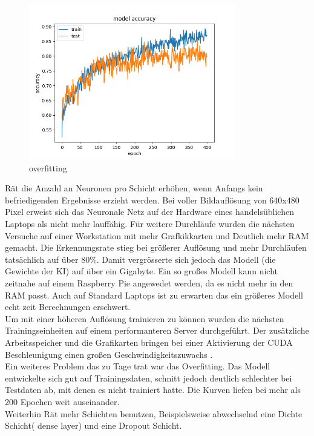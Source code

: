 \documentclass[conference]{IEEEtran}
\begin{document}
	\begin{figure}[!h]
		\centering
		\includegraphics[width=9cm]{img/213x160:400@32_accuracy.png}
		\caption{overfitting}
		\label{Overfitt }
	\end{figure}
	
	\cite{moolayil2019learn} Rät die Anzahl an Neuronen pro Schicht erhöhen, wenn Anfangs kein befriedigenden Ergebnisse erzieht werden.
	Bei voller Bildauflösung von 640x480 Pixel erweist sich das Neuronale 
	Netz auf der Hardware eines handelsüblichen Laptops als nicht mehr 
	lauffähig. Für weitere Durchläufe wurden die nächsten Versuche auf einer 
	Workstation mit mehr Grafkikkarten und Deutlich mehr RAM gemacht. 
	Die Erkennungsrate stieg bei größerer Auflösung und mehr Durchläufen 
	tatsächlich auf über 80\%. Damit vergrösserte sich jedoch das Modell (die 
	Gewichte der KI) auf über ein Gigabyte. Ein so großes Modell kann nicht 
	zeitnahe auf einem Raspberry Pie angewedet werden, da es nicht mehr in 
	den RAM passt. Auch auf Standard Laptops ist zu erwarten das ein 
	größeres Modell echt zeit Berechnungen erschwert. \\
	
	Um mit einer höheren Auflösung trainieren zu können wurden die 
	nächsten Trainingseinheiten auf einem performanteren Server 
	durchgeführt. Der zusätzliche Arbeitsspeicher und die Grafikarten 
	bringen bei einer Aktivierung der CUDA Beschleunigung einen großen 
	Geschwindigkeitszuwachs . \\
	
	Ein weiteres Problem das zu Tage trat war das Overfitting. Das Modell entwickelte sich gut auf Trainingsdaten, schnitt jedoch deutlich schlechter bei Testdaten ab, mit denen es nicht trainiert hatte. Die Kurven liefen bei mehr als 200 Epochen weit auseinander.\\
	
	
	Weiterhin Rät \cite{moolayil2019learn} mehr Schichten benutzen, 
	Beispielsweise abwechselnd eine Dichte Schicht( dense layer) und eine 
	Dropout Schicht.
	
\end{document}
